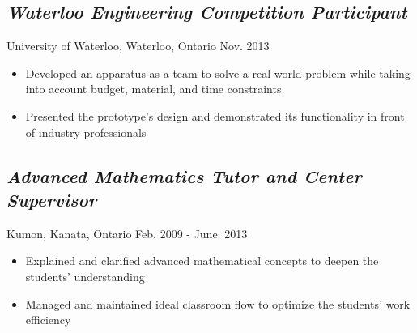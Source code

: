 \documentclass[12pt]{article}
\begin{document}
\begin{minipage}[t]{0.8\linewidth}
	\subsection*{\textit{Waterloo Engineering Competition Participant}} \vspace{-6pt} 
		University of Waterloo, Waterloo, Ontario \hspace{97pt} Nov. 2013
		\begin{itemize}
			\item Developed an apparatus as a team to solve a real world problem while taking into account budget, 				material, and time constraints
			\item Presented the prototype's design and demonstrated its functionality in front of industry 								professionals
		\end{itemize}	
	
	\subsection*{\textit{Advanced Mathematics Tutor and Center Supervisor}} \vspace{-6pt}
		Kumon, Kanata, Ontario \hspace{119pt} Feb. 2009 - June. 2013
		\begin{itemize}
			\item Explained and clarified advanced mathematical concepts to deepen the students' understanding
			\item Managed and maintained ideal classroom flow to optimize the students' work efficiency
		\end{itemize}
\end{minipage}
\end{document}

